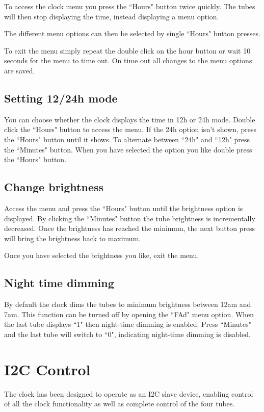 \documentclass[12pt]{article}
\begin{document}
To access the clock menu you press the ``Hours" button twice quickly. The tubes will then stop displaying the time, instead displaying a menu option.

The different menu options can then be selected by single ``Hours" button presses.

To exit the menu simply repeat the double click on the hour button or wait 10 seconds for the menu to time out. On time out all changes to the menu options are saved.

\subsection{Setting 12/24h mode}
You can choose whether the clock displays the time in 12h or 24h mode. Double click the ``Hours" button to access the menu. If the 24h option isn't shown, press the ``Hours" button until it shows. To alternate between ``24h" and ``12h" press the ``Minutes" button. When you have selected the option you like double press the ``Hours" button.

\subsection{Change brightness}
Access the menu and press the ``Hours" button until the brightness option is displayed. By clicking the ``Minutes" button the tube brightness is incrementally decreased. Once the brightness has reached the minimum, the next button press will bring the brightness back to maximum. 

Once you have selected the brightness you like, exit the menu.

\subsection{Night time dimming}
By default the clock dims the tubes to minimum brightness between 12am and 7am. This function can be turned off by opening the ``FAd" menu option. When the last tube displays ``1" then night-time dimming is enabled. Press ``Minutes" and the last tube will switch to ``0", indicating night-time dimming is disabled.

\renewcommand{\figurename}{Fig}

\section{I2C Control}
The clock has been designed to operate as an I2C slave device, enabling control of all the clock functionality as well as complete control of the four tubes. 
\end{document}
